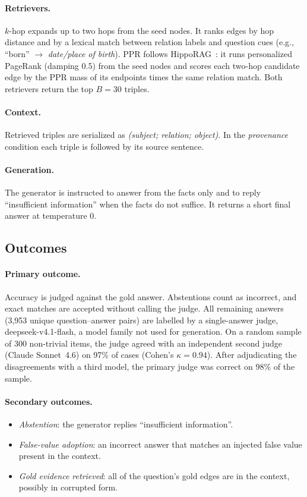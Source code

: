 \documentclass[11pt]{article}
\newcommand{\khop}{$k$-hop\xspace}
\begin{document}
\paragraph{Retrievers.} \khop expands up to two hops from the seed nodes. It ranks edges by hop distance and by a lexical match between relation labels and question cues (e.g., ``born'' $\rightarrow$ \emph{date/place of birth}). PPR follows HippoRAG~\cite{gutierrez2024hipporag}: it runs personalized PageRank (damping 0.5) from the seed nodes and scores each two-hop candidate edge by the PPR mass of its endpoints times the same relation match. Both retrievers return the top $B=30$ triples.

\paragraph{Context.} Retrieved triples are serialized as \emph{(subject; relation; object)}. In the \emph{provenance} condition each triple is followed by its source sentence.

\paragraph{Generation.} The generator is instructed to answer from the facts only and to reply ``insufficient information'' when the facts do not suffice. It returns a short final answer at temperature 0.

\subsection{Outcomes}
\paragraph{Primary outcome.} Accuracy is judged against the gold answer. Abstentions count as incorrect, and exact matches are accepted without calling the judge. All remaining answers (3,953 unique question--answer pairs) are labelled by a single-answer judge, deepseek-v4.1-flash, a model family not used for generation. On a random sample of 300 non-trivial items, the judge agreed with an independent second judge (Claude Sonnet~4.6) on 97\% of cases (Cohen's $\kappa=0.94$). After adjudicating the disagreements with a third model, the primary judge was correct on 98\% of the sample.

\paragraph{Secondary outcomes.}
\begin{itemize}
\item \emph{Abstention}: the generator replies ``insufficient information''.
\item \emph{False-value adoption}: an incorrect answer that matches an injected false value present in the context.
\item \emph{Gold evidence retrieved}: all of the question's gold edges are in the context, possibly in corrupted form.
\end{itemize}
\end{document}
